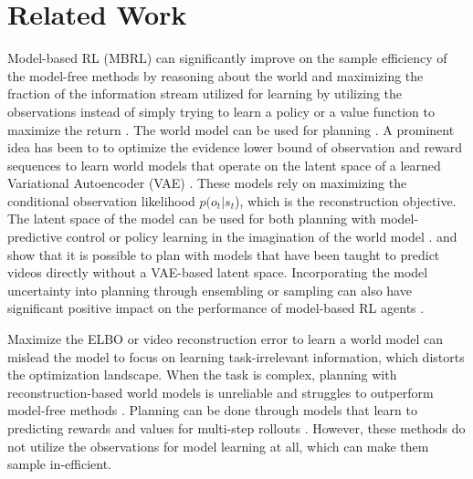 \documentclass{article}
\theoremstyle{plain}
\theoremstyle{definition}
\theoremstyle{remark}
\begin{document}
\section{Related Work}
\label{sec:related_work}

Model-based RL (MBRL) can significantly improve on the sample efficiency of the model-free methods by reasoning about the world and maximizing the fraction of the information stream utilized for learning by utilizing the observations instead of simply trying to learn a policy or a value function to maximize the return \cite{haRecurrentWorldModels2018}. The world model can be used for planning \cite{allen1983planning, basye1992decision}. A prominent idea has been to to optimize the evidence lower bound of observation and reward sequences to learn world models that operate on the latent space of a learned Variational Autoencoder (VAE) \cite{kingmaAutoEncoding2014, igl2018deep}. These models rely on maximizing the conditional observation likelihood $p(o_t | s_t$), which is the reconstruction objective. The latent space of the model can be used for both planning with model-predictive control \cite{rubinstein1997optimization, hafnerLearning2019} or policy learning in the imagination of the world model \cite{hafner2019dream}. \citet{finn2017deep} and \citet{ebert2018visual} show that it is possible to plan with models that have been taught to predict videos directly without a VAE-based latent space. Incorporating the model uncertainty into planning through ensembling or sampling can also have significant positive impact on the performance of model-based RL agents \cite{deisenrothPILCO2011, chua2018deep, janner2019trust, yu2020mopo, clavera2020model}.

Maximize the ELBO or video reconstruction error to learn a world model can mislead the model to focus on learning task-irrelevant information, which distorts the optimization landscape. When the task is complex, planning with reconstruction-based world models is unreliable \cite{lutter2021learning} and struggles to outperform model-free methods \cite{kostrikov2020image, yarats2021mastering}. Planning can be done through models that learn to predicting rewards and values for multi-step rollouts \cite {tamar2016value, silver2017predictron, oh2017value, schrittwieser2020mastering}. However, these methods do not utilize the observations for model learning at all, which can make them sample in-efficient.
\end{document}
